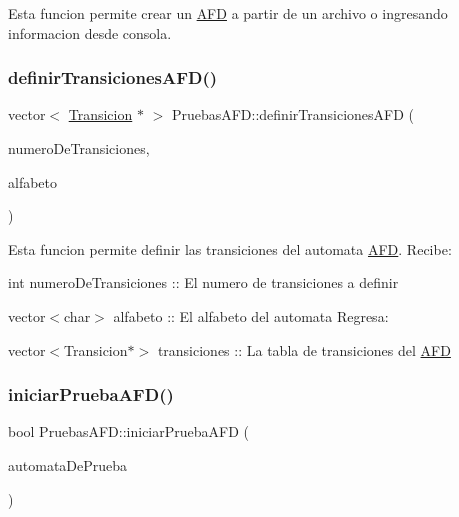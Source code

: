 Esta funcion permite crear un \hyperlink{class_a_f_d}{A\+FD} a partir de un archivo o ingresando informacion desde consola. \mbox{\label{class_pruebas_a_f_d_a991ac328ebeae3ca84958887cbf4e41d}} 
\subsubsection{\texorpdfstring{definir\+Transiciones\+A\+F\+D()}{definirTransicionesAFD()}}
{\footnotesize\ttfamily vector$<$ \hyperlink{class_transicion}{Transicion} $\ast$ $>$ Pruebas\+A\+F\+D\+::definir\+Transiciones\+A\+FD (\begin{DoxyParamCaption}\item[{int}]{numero\+De\+Transiciones,  }\item[{std\+::vector$<$ char $>$}]{alfabeto }\end{DoxyParamCaption})}

Esta funcion permite definir las transiciones del automata \hyperlink{class_a_f_d}{A\+FD}. Recibe\+:
\begin{DoxyItemize}
\item int numero\+De\+Transiciones \+:\+: El numero de transiciones a definir
\item vector$<$char$>$ alfabeto \+:\+: El alfabeto del automata Regresa\+:
\item vector$<$\+Transicion$\ast$$>$ transiciones \+:\+: La tabla de transiciones del \hyperlink{class_a_f_d}{A\+FD} 
\end{DoxyItemize}\mbox{\label{class_pruebas_a_f_d_ae8c9889569bc90bc8f55c3b09c4570eb}} 
\subsubsection{\texorpdfstring{iniciar\+Prueba\+A\+F\+D()}{iniciarPruebaAFD()}}
{\footnotesize\ttfamily bool Pruebas\+A\+F\+D\+::iniciar\+Prueba\+A\+FD (\begin{DoxyParamCaption}\item[{\hyperlink{class_a_f_d}{A\+FD}}]{automata\+De\+Prueba }\end{DoxyParamCaption})}

